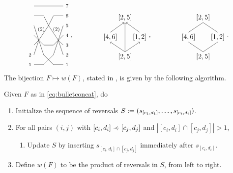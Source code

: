 \documentclass[11pt]{article}
\theoremstyle{definition}
\numberwithin{equation}{section}
\begin{document}
\begin{equation}
\begin{gathered}
\begin{tikzpicture}[scale=.5,baseline=55]
  \node at (-.4,2) {$\scriptstyle 2$};
  \node at (-.4,1) {$\scriptstyle 1$};
  \node at (3.4,7) {$\scriptstyle 7$};
  \node at (3.4,6) {$\scriptstyle 6$};
  \node at (3.4,5) {$\scriptstyle 5$};
  \node at (3.4,4) {$\scriptstyle 4$};
  \node at (3.4,3) {$\scriptstyle 3$};
  \node at (3.4,2) {$\scriptstyle 2$};
  \node at (3.4,1) {$\scriptstyle 1$};
\draw[-] (0,7) -- (3,7);
\draw[-] (0,6) -- (1,6) -- (1.5,5) -- (2.5,3.5) -- (3,2);
\draw[-] (0,5) -- (1,2) -- (2,1) -- (3,1);
\draw[-] (0,4) -- (1,3) -- (2,3) -- (3,4);
\draw[-] (0,3) -- (0.5,3.5) -- (1.5,5) -- (2,6) -- (3,6);
\draw[-] (0,2) -- (0.5,3.5);
\draw[-] (2.5,3.5) -- (3,3);
\draw[-] (0,1) -- (1,1) -- (2,2) -- (3,5);
\node at (0.75,4.6) {$\scriptstyle{(2)}$};
\node at (2.3,4.6) {$\scriptstyle{(2)}$};
\end{tikzpicture},
  \qquad \qquad
\begin{tikzpicture}[scale=.5,baseline=15]
\node at (0,1) {$[1, 2]$};            %
\node at (-1.5,-1) {$[2,5]$};         %
\node at (-3,1) {$[4,6]$};            %
\node at (-1.5,3) {$[2,5]$};            %
\draw[->] (-3,1.5) -- (-1.6,2.5);
\draw[->] (0,1.5) -- (-1.4,2.5);
\draw[->] (-1.5,-0.5) -- (-1.5,2.5);
\draw[<-] (0,0.5) -- (-1.5,-0.5);
\draw[<-] (-3,0.5) -- (-1.5,-0.5);
\end{tikzpicture},
  \qquad \qquad
\begin{tikzpicture}[scale=.5,baseline=15]
\node at (0,1) {$[1,2]$};            %
\node at (-1.5,-1) {$[2,5]$};          %
\node at (-3,1) {$[4,6]$};            %
\node at (-1.5,3) {$[2,5]$};            %
\draw[-] (-3,1.5) -- (-1.5,2.5);
\draw[-] (0,1.5) -- (-1.5,2.5);
\draw[-] (0,0.5) -- (-1.5,-0.5);
\draw[-] (-3,0.5) -- (-1.5,-0.5);
\end{tikzpicture}.
\end{gathered}
\end{equation}
The bijection $F \mapsto w(F)$,
stated in
\cite[\S 3]{SkanNNDCB},
is given by the following algorithm.
\begin{alg}\label{a:FwF}
  Given $F$ as in \eqref{eq:bulletconcat}, do
  \begin{enumerate}
\item 
  Initialize the sequence of reversals
  $S := (s_{[c_1,d_1]}, \dotsc, s_{[c_t,d_t]})$.
\item 
  For all pairs $(i,j)$ with $[c_i,d_i] \prec \negthickspace \negthinspace \cdot\  [c_j,d_j]$ and
  $|[c_i,d_i] \cap [c_j,d_j]| > 1$,
 \begin{enumerate}[]
 \item Update $S$ by inserting $s_{[c_i,d_i] \cap [c_j,d_j]}$
   immediately after $s_{[c_i,d_i]}$.
 \end{enumerate}
\item Define $w(F)$ to be the product of reversals in $S$, from left to right.
\end{enumerate}
\end{alg}
\end{document}
